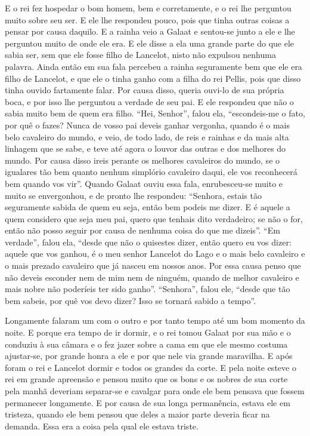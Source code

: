 E o rei fez hospedar o bom homem, bem e corretamente, e o rei lhe perguntou
muito sobre seu ser. E ele lhe respondeu pouco, pois que tinha outras coisas a
pensar por causa daquilo. E a rainha veio a Galaat e sentou-se junto a ele e
lhe perguntou muito de onde ele era. E ele disse a ela uma grande parte do que
ele sabia ser, sem que ele fosse filho de Lancelot, nisto não expulsou nenhuma
palavra. Ainda então em sua fala percebeu a rainha seguramente bem que ele era
filho de Lancelot, e que ele o tinha ganho com a filha do rei Pellis,  pois
que disso tinha ouvido fartamente falar. Por causa disso, queria ouvi-lo de sua
própria boca, e por isso lhe perguntou a verdade de seu pai. E ele respondeu
que não o sabia muito bem de quem era filho. “Hei, Senhor”, falou ela,
“escondeis-me o fato, por quê o fazes? Nunca de vosso pai deveis ganhar
vergonha, quando é o mais belo cavaleiro do mundo, e veio, de todo lado, de
reis e rainhas e da mais alta linhagem que se sabe, e teve até agora o louvor
das outras e dos melhores do mundo. Por causa disso ireis perante os melhores
cavaleiros do mundo, se o igualares tão bem quanto nenhum simplório cavaleiro
daqui, ele vos reconhecerá bem quando vos vir”. Quando Galaat ouviu
essa fala, enrubesceu-se muito e muito se envergonhou, e de pronto lhe
respondeu: “Senhora, estais tão seguramente sabida de quem eu seja, então bem
podeis me dizer. E é aquele a quem considero que seja meu pai, quero que
tenhais dito verdadeiro; se não o for, então não posso seguir por causa de
nenhuma coisa do que me dizeis”. “Em verdade”, falou ela, “desde que não o
quisestes dizer, então quero eu vos dizer: aquele que vos ganhou, é o meu
senhor Lancelot do Lago e o mais belo cavaleiro e o mais prezado cavaleiro que
já nasceu em nossos anos. Por essa causa penso que não deveis esconder nem de
mim nem de ninguém, quando de melhor cavaleiro e mais nobre não poderíeis ter
sido ganho”. “Senhora”, falou ele, “desde que tão bem sabeis, por quê vos devo
dizer? Isso se tornará sabido a tempo”.

Longamente falaram um com o outro e por tanto tempo até um bom momento da noite.
E porque era tempo de ir dormir, e o rei tomou Galaat por sua mão e o conduziu
à sua câmara e o fez jazer sobre a cama em que ele mesmo costuma ajustar-se,
por grande honra a ele e por que nele via grande maravilha. E após foram o rei
e Lancelot dormir e todos os grandes da corte. E pela noite esteve o rei em
grande apreensão e pensou muito que os bons e os nobres de sua corte pela manhã
deveriam separar-se e cavalgar para onde ele bem pensava que fossem permanecer
longamente. E por causa de sua longa permanência, estava ele em tristeza,
quando ele bem pensou que deles a maior parte deveria ficar na demanda. Essa
era a coisa pela qual ele estava triste.

